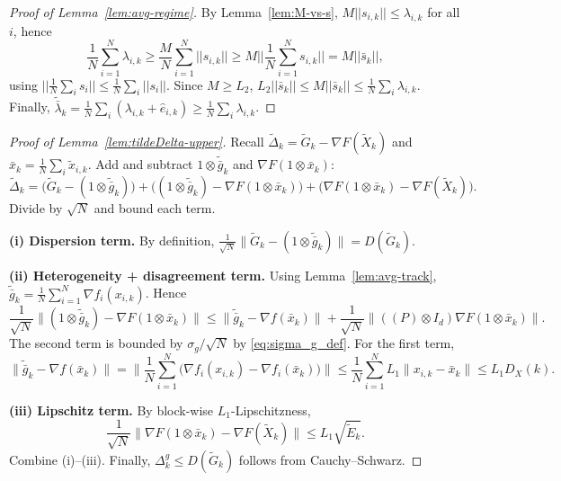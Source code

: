 \documentclass[11pt,a4paper]{article}
\def\one{1}%
\def\J{J}%
\def\Pmat{P}%
\def\norm#1{||#1||}%
\newcommand{\one}{\mathbf{1}}
\newcommand{\norm}[1]{\left\|#1\right\|}
\newcommand{\J}{\left(\frac{1}{N}\one\one^\top\right)}
\newcommand{\Pmat}{I-\J}
\begin{document}
	\begin{proof}[Proof of Lemma~\ref{lem:avg-regime}]
		By Lemma~\ref{lem:M-vs-s}, $M\norm{s_{i,k}}\le \lambda_{i,k}$ for all $i$, hence
		\[
		\frac1N\sum_{i=1}^N \lambda_{i,k}\ge \frac{M}{N}\sum_{i=1}^N \norm{s_{i,k}}
		\ge M \norm{\frac1N\sum_{i=1}^N s_{i,k}}
		= M\norm{\bar s_k},
		\]
		using $\norm{\frac1N\sum_i s_i}\le \frac1N\sum_i\norm{s_i}$.
		Since $M\ge L_2$, $L_2\norm{\bar s_k}\le M\norm{\bar s_k}\le \frac1N\sum_i\lambda_{i,k}$.
		Finally, $\tilde{\bar\lambda}_k=\frac1N\sum_i(\lambda_{i,k}+\hat e_{i,k})\ge \frac1N\sum_i\lambda_{i,k}$.
	\end{proof}
	
	
	\begin{proof}[Proof of Lemma~\ref{lem:tildeDelta-upper}]
		Recall $\tilde\Delta_k=\tilde G_k-\nabla F(\tilde X_k)$ and $\bar x_k=\frac1N\sum_i \tilde x_{i,k}$.
		Add and subtract $\one\otimes\tilde{\bar g}_k$ and $\nabla F(\one\otimes\bar x_k)$:
		\[
		\tilde\Delta_k
		=\big(\tilde G_k-(\one\otimes\tilde{\bar g}_k)\big)
		+\big((\one\otimes\tilde{\bar g}_k)-\nabla F(\one\otimes\bar x_k)\big)
		+\big(\nabla F(\one\otimes\bar x_k)-\nabla F(\tilde X_k)\big).
		\]
		Divide by $\sqrt N$ and bound each term.
		
		\noindent\textbf{(i) Dispersion term.}
		By definition,
		$\frac{1}{\sqrt N}\|\tilde G_k-(\one\otimes\tilde{\bar g}_k)\|=D(\tilde G_k)$.
		
		\noindent\textbf{(ii) Heterogeneity + disagreement term.}
		Using Lemma~\ref{lem:avg-track}, $\tilde{\bar g}_k=\frac1N\sum_{i=1}^N\nabla f_i(x_{i,k})$.
		Hence
		\[
		\frac{1}{\sqrt N}\|(\one\otimes\tilde{\bar g}_k)-\nabla F(\one\otimes\bar x_k)\|
		\le \|\tilde{\bar g}_k-\nabla f(\bar x_k)\|+\frac{1}{\sqrt N}\|((\Pmat)\otimes I_d)\nabla F(\one\otimes\bar x_k)\|.
		\]
		The second term is bounded by $\sigma_g/\sqrt N$ by \eqref{eq:sigma_g_def}.
		For the first term,
		\[
		\|\tilde{\bar g}_k-\nabla f(\bar x_k)\|
		=\Big\|\frac1N\sum_{i=1}^N\big(\nabla f_i(x_{i,k})-\nabla f_i(\bar x_k)\big)\Big\|
		\le \frac1N\sum_{i=1}^N L_1\|x_{i,k}-\bar x_k\|
		\le L_1 D_X(k).
		\]
		
		\noindent\textbf{(iii) Lipschitz term.}
		By block-wise $L_1$-Lipschitzness,
		\[
		\frac{1}{\sqrt N}\|\nabla F(\one\otimes\bar x_k)-\nabla F(\tilde X_k)\|
		\le L_1\sqrt{\tilde E_k}.
		\]
		Combine (i)--(iii). Finally, $\Delta_k^g\le D(\tilde G_k)$ follows from Cauchy--Schwarz.
	\end{proof}
	
\end{document}
